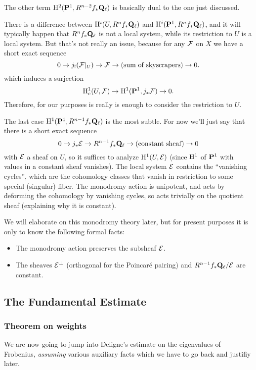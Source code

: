 The other term $\mathrm{H}^2(\mathbf{P}^1, R^{n-2} f_* \mathbf{Q}_{\ell})$ is basically dual to the one just discussed. 

\begin{rem}
There is a difference between $\mathrm{H}^i(U, R^n f_* \mathbf{Q}_{\ell})$ and $\mathrm{H}^i(\mathbf{P}^1 ,R^n f_* \mathbf{Q}_{\ell})$, and it will typically happen that $R^n f_* \mathbf{Q}_{\ell}$ is not a local system, while its restriction to $U$ is a local system. But that's not really an issue, because for any $\mathcal{F}$ on $X$ we have a short exact sequence 
\[
0 \rightarrow j_! (\mathcal{F}|_U)  \rightarrow \mathcal{F} \rightarrow \text{(sum of skyscrapers)} \rightarrow 0.
\]
which induces a surjection 
\[
\mathrm{H}_c^1(U, \mathcal{F}) \rightarrow \mathrm{H}^1(\mathbf{P}^1, j_* \mathcal{F}) \rightarrow 0.
\]
Therefore, for our purposes is really is enough to consider the restriction to $U$. 
\end{rem}

The last case $\mathrm{H}^1(\mathbf{P}^1, R^{n-1} f_* \mathbf{Q}_{\ell})$ is the most subtle. For now we'll just say that there is a short exact sequence 
\begin{equation}\label{vanishing_sequence}
0 \rightarrow j_* \mathcal{E} \rightarrow R^{n-1} f_* \mathbf{Q}_{\ell} \rightarrow \text{(constant sheaf)} \rightarrow 0
\end{equation}
with $\mathcal{E}$ a sheaf on $U$, so it suffices to analyze $\mathrm{H}^1(U,  \mathcal{E})$ (since $\mathrm{H}^1$ of $\mathbf{P}^1$ with values in a constant sheaf vanishes). The local system $\mathcal{E}$ contains the ``vanishing cycles'', which are the cohomology classes that vanish in restriction to some special (singular) fiber. The monodromy action is unipotent, and acts by deforming the cohomology by vanishing cycles, so acts trivially on the quotient sheaf (explaining why it is constant).

 We will elaborate on this monodromy theory later, but for present purposes it is only to know the following formal facts:
 \begin{itemize}
 \item The monodromy action preserves the subsheaf $\mathcal{E}$.
 \item The sheaves $\mathcal{E}^{\perp}$ (orthogonal for the Poincar\'{e} pairing) and $ R^{n-1} f_* \mathbf{Q}_{\ell} / \mathcal{E}$ are constant.
\end{itemize}  


\subsection{The Fundamental Estimate}
\subsubsection{Theorem on weights}
We are now going to jump into Deligne's estimate on the eigenvalues of Frobenius, \emph{assuming} various auxiliary facts which we have to go back and justifiy later. 

